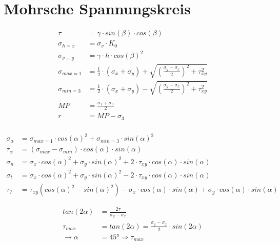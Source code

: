 \section{Mohrsche Spannungskreis}
	\begin{minipage}{\linewidth}
	\begin{align*}
		\tau	 		&= \gamma \cdot sin(\beta) \cdot cos(\beta) \\
		\sigma_{h=x} 	&= \sigma_v \cdot K_0 \\
		\sigma_{v=y} 	&= \gamma \cdot h \cdot cos(\beta)^2 \\ 
		\sigma_{max=1}	&=\frac{1}{2} \cdot (\sigma_x + \sigma_y) + \sqrt{\left(\frac{\sigma_y - \sigma_x}{2}\right)^2 + \tau_{xy}^2} \\
		\sigma_{min=3}	&=\frac{1}{2} \cdot (\sigma_x + \sigma_y) - \sqrt{\left(\frac{\sigma_y - \sigma_x}{2}\right)^2 + \tau_{xy}^2} \\
	 \\
		MP				&= \frac{\sigma_1 + \sigma_3}{2} \\
		r				&= MP - \sigma_3 \\
	\end{align*}
	\end{minipage}	
	
	\vspace*{4cm}
	\begin{minipage}{\linewidth}
	\begin{align*}
		\sigma_\alpha	&=\sigma_{max=1} \cdot cos(\alpha)^2 + \sigma_{min=3} \cdot sin(\alpha)^2 \\
		\tau_\alpha		&= (\sigma_{max} -\sigma_{min}) \cdot cos(\alpha) \cdot sin(\alpha) \\
		\sigma_n		&= \sigma_x \cdot cos(\alpha)^2 + \sigma_y \cdot sin(\alpha)^2 + 2 \cdot \tau_{xy} \cdot cos(\alpha) \cdot sin(\alpha) \\
		\sigma_t		&= \sigma_x \cdot cos(\alpha)^2 + \sigma_y \cdot sin(\alpha)^2 - 2 \cdot \tau_{xy} \cdot cos(\alpha) \cdot sin(\alpha) \\
		\tau_?			&= \tau_{xy} (cos(\alpha)^2 - sin(\alpha)^2) - \sigma_x \cdot cos(\alpha) \cdot sin(\alpha) + \sigma_y \cdot cos(\alpha) \cdot sin(\alpha)
	\end{align*}
	\end{minipage}

	\vspace*{4cm}
	\begin{minipage}{\linewidth}
	\begin{align*}
		tan(2 \alpha)	&= \frac{2 \tau}{\sigma_y - \sigma_x} \\
		\tau_{max}		&= tan(2 \alpha) = \frac{\sigma_y - \sigma_x}{2} \cdot sin(2 \alpha) \\
		\rightarrow \alpha &= 45° \Rightarrow \tau_{max} \\ 
	\end{align*}
	\end{minipage}